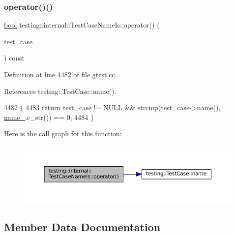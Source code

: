 \subsubsection{\texorpdfstring{operator()()}{operator()()}}
{\footnotesize\ttfamily \hyperlink{classbool}{bool} testing\+::internal\+::\+Test\+Case\+Name\+Is\+::operator() (\begin{DoxyParamCaption}\item[{const \hyperlink{classtesting_1_1TestCase}{Test\+Case} $\ast$}]{test\+\_\+case }\end{DoxyParamCaption}) const\hspace{0.3cm}{\ttfamily [inline]}}



Definition at line 4482 of file gtest.\+cc.



References testing\+::\+Test\+Case\+::name().


\begin{DoxyCode}
4482                                                    \{
4483     \textcolor{keywordflow}{return} test\_case != NULL && strcmp(test\_case->name(), \hyperlink{classtesting_1_1internal_1_1TestCaseNameIs_a4e780c6613a81c4f14fc57e00c61474b}{name\_}.c\_str()) == 0;
4484   \}
\end{DoxyCode}
Here is the call graph for this function\+:
\nopagebreak
\begin{figure}[H]
\begin{center}
\leavevmode
\includegraphics[width=350pt]{classtesting_1_1internal_1_1TestCaseNameIs_aa96c4e9facbaa7043c8f0b34465d1eae_cgraph}
\end{center}
\end{figure}


\subsection{Member Data Documentation}
\mbox{\label{classtesting_1_1internal_1_1TestCaseNameIs_a4e780c6613a81c4f14fc57e00c61474b}} 
